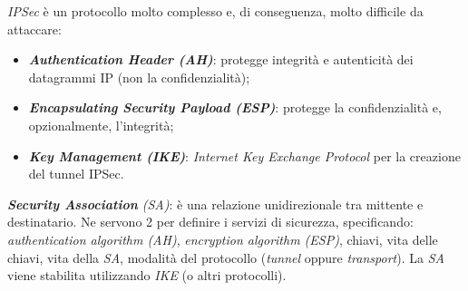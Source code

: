\documentclass[11pt, a4paper, twoside, italian]{report}
\theoremstyle{plain}
\begin{document}
\textit{IPSec} è un protocollo molto complesso e, di conseguenza, molto difficile da attaccare:
\begin{itemize}
	\item \textbf{\textit{Authentication Header (AH)}}: protegge integrità e autenticità dei datagrammi IP (non la confidenzialità);
	\item \textbf{\textit{Encapsulating Security Payload (ESP)}}: protegge la confidenzialità e, opzionalmente, l'integrità;
	\item \textbf{\textit{Key Management (IKE)}}: \textit{Internet Key Exchange Protocol} per la creazione del tunnel IPSec.
\end{itemize}
\noindent
\textit{\textbf{Security Association} (SA)}: è una relazione unidirezionale tra mittente e destinatario. Ne servono 2 per definire i servizi di sicurezza, specificando: \textit{authentication algorithm (AH)}, \textit{encryption algorithm (ESP)}, chiavi, vita delle chiavi, vita della \textit{SA}, modalità del protocollo (\textit{tunnel} oppure \textit{transport}). La \textit{SA} viene stabilita utilizzando \textit{IKE} (o altri protocolli).
\end{document}
